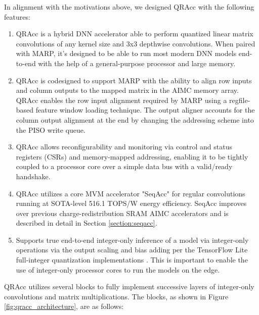 In alignment with the motivations above, we designed QRAcc with the following features:

\begin{enumerate}
    \item QRAcc is a hybrid DNN accelerator able to perform quantized linear matrix convolutions of any kernel size and 3x3 depthwise convolutions. When paired with MARP, it's designed to be able to run most modern DNN models end-to-end with the help of a general-purpose processor and large memory.
    \item QRAcc is codesigned to support MARP with the ability to align row inputs and column outputs to the mapped matrix in the AIMC memory array. QRAcc enables the row input alignment required by MARP using a regfile-based feature window loading technique. The output aligner accounts for the column output alignment at the end by changing the addressing scheme into the PISO write queue. 
    \item QRAcc allows reconfigurability and monitoring via control and status registers (CSRs) and memory-mapped addressing, enabling it to be tightly coupled to a processor core over a simple data bus with a valid/ready handshake.
    \item QRAcc utilizes a core MVM accelerator "SeqAcc" for regular convolutions running at SOTA-level 516.1 TOPS/W energy efficiency. SeqAcc improves over previous charge-redistribution SRAM AIMC accelerators \cite{jiang2020c3sram} and is described in detail in Section \ref{section:seqacc}.
    \item Supports true end-to-end integer-only inference of a model via integer-only operations via the output scaling and bias adding per the TensorFlow Lite full-integer quantization implementations \cite{jacob2018quantization}. This is important to enable the use of integer-only processor cores to run the models on the edge.
\end{enumerate}

QRAcc utilizes several blocks to fully implement successive layers of integer-only convolutions and matrix multiplications. The blocks, as shown in Figure \ref{fig:qracc_architecture}, are as follows:

